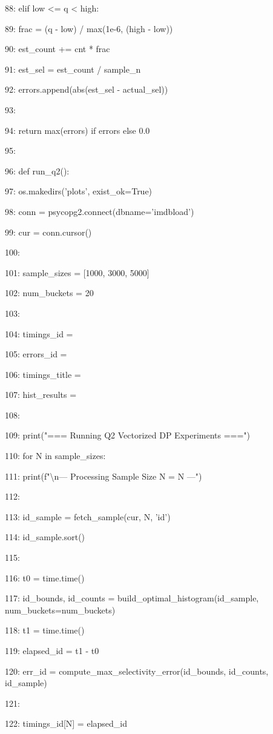 \documentclass[11pt,a4paper]{article}
\begin{document}
{{{88:             elif low <= q < high:

89:                 frac = (q - low) / max(1e-6, (high - low))

90:                 est\_count += cnt * frac

91:         est\_sel = est\_count / sample\_n

92:         errors.append(abs(est\_sel - actual\_sel))

93:

94:     return max(errors) if errors else 0.0

95:

96: def run\_q2():

97:     os.makedirs('plots', exist\_ok=True)

98:     conn = psycopg2.connect(dbname='imdbload')

99:     cur = conn.cursor()

100:

101:     sample\_sizes = [1000, 3000, 5000]

102:     num\_buckets = 20

103:

104:     timings\_id = {}

105:     errors\_id = {}

106:     timings\_title = {}

107:     hist\_results = {}

108:

109:     print("=== Running Q2 Vectorized DP Experiments ===")

110:     for N in sample\_sizes:

111:         print(f"\textbackslash{}n--- Processing Sample Size N = {N} ---")

112:

113:         id\_sample = fetch\_sample(cur, N, 'id')

114:         id\_sample.sort()

115:

116:         t0 = time.time()

117:         id\_bounds, id\_counts = build\_optimal\_histogram(id\_sample, num\_buckets=num\_buckets)

118:         t1 = time.time()

119:         elapsed\_id = t1 - t0

120:         err\_id = compute\_max\_selectivity\_error(id\_bounds, id\_counts, id\_sample)

121:

122:         timings\_id[N] = elapsed\_id

}}}
\end{document}
